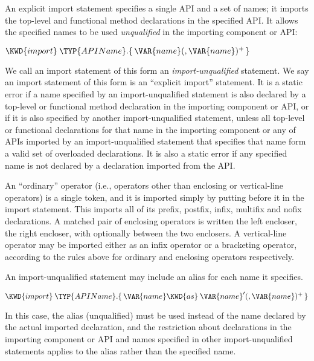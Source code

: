 An explicit import statement specifies a single API and a set of names;
it imports the top-level and functional method declarations in the specified API.
It allows the specified names to be used \emph{unqualified}
in the importing component or API:
\begin{Fortress}
\( \KWD{import}\:\TYP{APIName}.\{\,\VAR{name} (, \VAR{name})^+\,\}\)
\end{Fortress}
We call an import statement of this form
an \emph{import-unqualified} statement.
We say an import statement of this form is an ``explicit import'' statement.
It is a static error if
a name specified by an import-unqualified
statement
is also declared by a top-level or functional method declaration
in the importing component or API,
or if it is also specified by another import-unqualified
statement,
unless all top-level or functional declarations for that name
in the importing component or any of APIs
imported by an import-unqualified
statement that specifies that name
form a valid set of overloaded declarations.
It is also a static error if any specified name
is not declared by a declaration imported from the API.


An ``ordinary'' operator (i.e., operators other than
 enclosing or vertical-line operators)
is a single token, and it is imported simply by putting 
before it in the import statement.  This imports all of its prefix, postfix,
infix, multifix and nofix declarations.
A matched pair of enclosing operators is written 
the left encloser, the right encloser, with \EXP{\cdot}
optionally between the two enclosers.
A vertical-line operator may be imported either as an infix operator or
a bracketing operator, according to the rules above for ordinary and
enclosing operators respectively.

An import-unqualified
statement may include an alias for each name it specifies.
\begin{Fortress}
\(\KWD{import}\:\TYP{APIName}.\{\,\VAR{name} \KWD{as}\:\VAR{name}' (, \VAR{name})^+\,\}\)
\end{Fortress}
In this case, the alias (unqualified) must be used
instead of the name declared by the actual imported declaration,
and the restriction about declarations
in the importing component or API
and names specified in other import-unqualified
statements
applies to the alias rather than the specified name.

